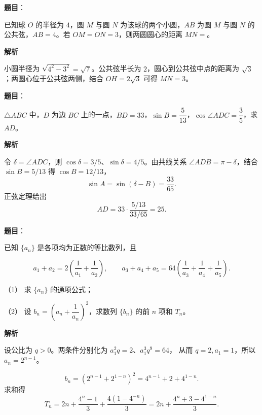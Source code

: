 \begin{answer}

\textbf{题目}：

已知球 $O$ 的半径为 $4$，圆 $M$ 与圆 $N$ 为该球的两个小圆，$AB$ 为圆 $M$ 与圆 $N$ 的公共弦，$AB=4$。若 $OM=ON=3$，则两圆圆心的距离 $MN=$\gkblank{}。

\textbf{解析}

小圆半径为 $\sqrt{4^2-3^2}=\sqrt7$。公共弦半长为 $2$，圆心到公共弦中点的距离为
$\sqrt3$；两圆心位于公共弦两侧，结合 $OH=2\sqrt3$ 可得 $MN=3$。


\end{answer}
\begin{answer}

\textbf{题目}：

$\triangle ABC$ 中，$D$ 为边 $BC$ 上的一点，$BD=33$，$\sin B=\dfrac5{13}$，$\cos\angle ADC=\dfrac35$，求 $AD$。

\textbf{解析}

令 $\delta=\angle ADC$，则 $\cos\delta=3/5$、$\sin\delta=4/5$。由共线关系
$\angle ADB=\pi-\delta$，结合 $\sin B=5/13$ 得 $\cos B=12/13$，
\nopagebreak[4]
\[
\sin A=\sin(\delta-B)=\frac{33}{65}.
\]
正弦定理给出
\nopagebreak[4]
\[
AD=33\cdot\frac{5/13}{33/65}=25.
\]


\end{answer}
\begin{answer}

\textbf{题目}：

已知 $\{a_n\}$ 是各项均为正数的等比数列，且

\nopagebreak[4]
\[
a_1+a_2=2\left(\frac1{a_1}+\frac1{a_2}\right),\qquad
a_3+a_4+a_5=64\left(\frac1{a_3}+\frac1{a_4}+\frac1{a_5}\right).
\]

（1） 求 $\{a_n\}$ 的通项公式；

（2） 设 $b_n=\left(a_n+\dfrac1{a_n}\right)^2$，求数列 $\{b_n\}$ 的前 $n$ 项和 $T_n$。

\textbf{解析}


设公比为 $q>0$。两条件分别化为 $a_1^2q=2$、$a_1^3q^9=64$，
从而 $q=2,a_1=1$，所以 $a_n=2^{n-1}$。


\nopagebreak[4]
\[
b_n=(2^{n-1}+2^{1-n})^2=4^{n-1}+2+4^{1-n}.
\]
求和得
\nopagebreak[4]
\[
T_n=2n+\frac{4^n-1}{3}+\frac{4(1-4^{-n})}{3}
=2n+\frac{4^n+3-4^{1-n}}3.
\]



\end{answer}
